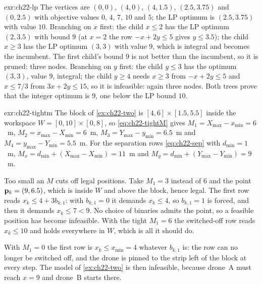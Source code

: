 
\begin{solution}{exr:ch22-lp}
The vertices are $(0,0)$, $(4,0)$, $(4,1.5)$, $(2.5,3.75)$ and $(0,2.5)$
with objective values $0$, $4$, $7$, $10$ and $5$; the LP optimum is
$(2.5,3.75)$ with value $10$. Branching on $x$ first: the child $x \le 2$
has the LP optimum $(2,3.5)$ with bound $9$ (at $x = 2$ the row $-x + 2y
\le 5$ gives $y \le 3.5$); the child $x \ge 3$ has the LP optimum $(3,3)$
with value $9$, which is integral and becomes the incumbent. The first
child's bound $9$ is not better than the incumbent, so it is pruned: three
nodes. Branching on $y$ first: the child $y \le 3$ has the optimum $(3,3)$,
value $9$, integral; the child $y \ge 4$ needs $x \ge 3$ from $-x + 2y \le
5$ and $x \le 7/3$ from $3x + 2y \le 15$, so it is infeasible: again three
nodes. Both trees prove that the integer optimum is $9$, one below the LP
bound $10$.
\end{solution}

\begin{solution}{exr:ch22-tightm}
The block of \cref{ex:ch22-two} is $[4,6] \times [1.5,5.5]$ inside the
workspace $W = [0,10] \times [0,8]$, so \cref{eq:ch22-tightM} gives
$M_1 = X_{\max} - x_{\min} = 6$~m, $M_2 = x_{\max} - X_{\min} = 6$~m,
$M_3 = Y_{\max} - y_{\min} = 6.5$~m and $M_4 = y_{\max} - Y_{\min} =
5.5$~m. For the separation rows \cref{eq:ch22-sep} with $d_{\min} = 1$~m,
$M_x = d_{\min} + (X_{\max} - X_{\min}) = 11$~m and
$M_y = d_{\min} + (Y_{\max} - Y_{\min}) = 9$~m.

Too small an $M$ cuts off legal positions. Take $M_1 = 3$ instead of $6$
and the point $\mathbf{p}_k = (9, 6.5)$, which is inside $W$ and above the block,
hence legal. The first row reads $x_k \le 4 + 3 b_{k,1}$: with
$b_{k,1} = 0$ it demands $x_k \le 4$, so $b_{k,1} = 1$ is forced, and then
it demands $x_k \le 7 < 9$. No choice of binaries admits the point, so a
feasible position has become infeasible. With the tight $M_1 = 6$ the
switched-off row reads $x_k \le 10$ and holds everywhere in $W$, which is
all it should do.

With $M_1 = 0$ the first row is $x_k \le x_{\min} = 4$ whatever $b_{k,1}$
is: the row can no longer be switched off, and the drone is pinned to the
strip left of the block at every step. The model of \cref{ex:ch22-two} is
then infeasible, because drone~A must reach $x = 9$ and drone~B starts
there.
\end{solution}

